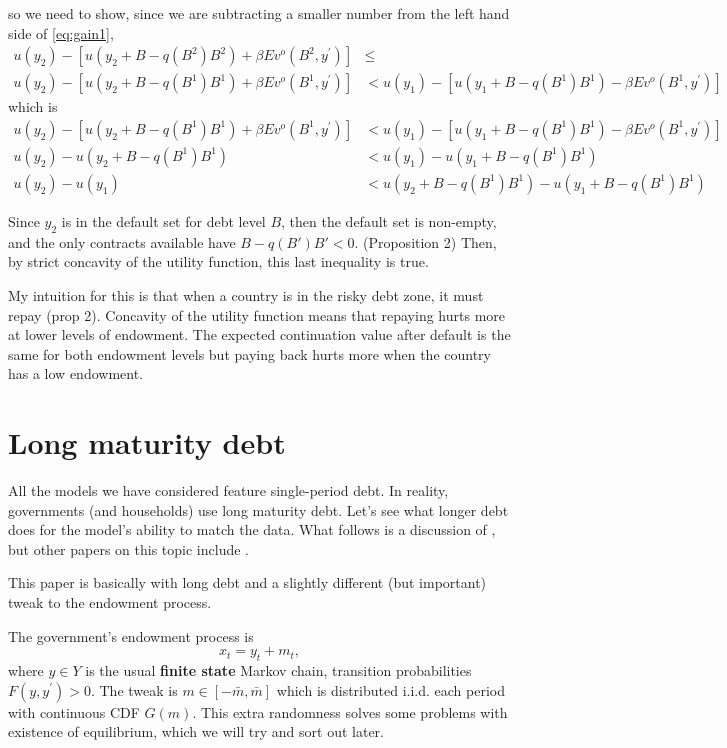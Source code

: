\documentclass[11pt, pdftex]{article}
\begin{document}
so we need to show, since we are subtracting a smaller number from the left hand side of \eqref{eq:gain1},
\begin{align*}
u(y_2) - \left[u(y_2+B-q(B^2)B^2)+ \beta Ev^o(B^2,y^\prime)\right] &\leq \\
  u(y_2) - \left[u(y_2+B-q(B^1)B^1)+ \beta Ev^o(B^1,y^\prime)\right] &<  u(y_1)  - \left[ u(y_1+B-q(B^1)B^1)- \beta Ev^o(B^1,y^\prime)\right]
\end{align*}
which is
\begin{align*}
u(y_2) - \left[u(y_2+B-q(B^1)B^1)+ \beta Ev^o(B^1,y^\prime)\right] &<  u(y_1)  - \left[ u(y_1+B-q(B^1)B^1)- \beta Ev^o(B^1,y^\prime)\right] \\
  u(y_2) - u(y_2+B-q(B^1)B^1) &<  u(y_1)  - u(y_1+B-q(B^1)B^1) \\
  u(y_2) - u(y_1) &< u(y_2+B-q(B^1)B^1)   - u(y_1+B-q(B^1)B^1)
\end{align*}

Since $y_2$ is in the default set for debt level $B$, then the default set is non-empty, and the only contracts available have $B-q(B')B'<0$. (Proposition 2) Then, by strict concavity of the utility function, this last inequality is true.

My intuition for this is that when a country is in the risky debt zone, it must repay (prop 2). Concavity of the utility function means that repaying hurts more at lower levels of endowment. The expected continuation value after default is the same for both endowment levels but paying back hurts more when the country has a low endowment.

\section{Long maturity debt}

All the models we have considered feature single-period debt. In reality, governments (and households) use long maturity debt. Let's see what longer debt does for the model's ability to match the data. What follows is a discussion of \citet{chaterjeeEyigungor}, but other papers on this topic include \citet{hatchondo2009long}.

This paper is basically \citet{A08} with long debt and a slightly different (but important) tweak to the endowment process.

The government's endowment process is
\begin{equation}\label{}
  x_t=y_t+m_t,
\end{equation}
where $y \in Y$ is the usual \textbf{finite state} Markov chain, transition probabilities $F(y,y^\prime)>0$. The tweak is $m \in [-\bar{m}, \bar{m}]$ which is distributed i.i.d. each period with continuous CDF $G(m)$. This extra randomness solves some problems with existence of equilibrium, which we will try and sort out later.
\end{document}
